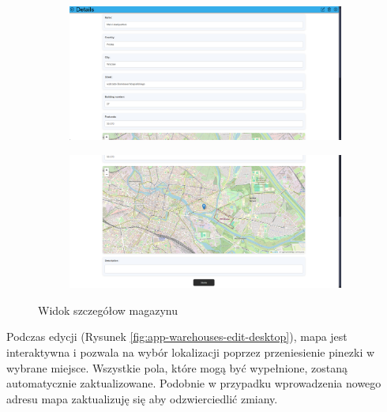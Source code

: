 \documentclass[../main.tex]{subfiles}
\begin{document}
            \begin{figure}[H]
                \begin{subfigure}{.49\textwidth}
                    \centering
                    \includegraphics[width=\getImageWidth]{images/app-desktop/app-warehouses-details1-desktop.png}
                    \label{fig:app-warehouses-details1-desktop}
                \end{subfigure}
                \begin{subfigure}{.49\textwidth}
                    \centering
                    \includegraphics[width=\getImageWidth]{images/app-desktop/app-warehouses-details2-desktop.png}
                    \label{fig:app-warehouses-details2-desktop}
                \end{subfigure}
                \caption{Widok szczegółow magazynu}
                \label{fig:app-warehouses-details-desktop}
            \end{figure}
            
            Podczas edycji (Rysunek \ref{fig:app-warehouses-edit-desktop}), mapa jest interaktywna i pozwala na wybór lokalizacji poprzez przeniesienie pinezki w wybrane miejsce. Wszystkie pola, które mogą być wypełnione, zostaną automatycznie zaktualizowane. Podobnie w przypadku wprowadzenia nowego adresu mapa zaktualizuję się aby odzwierciedlić zmiany.
\end{document}
